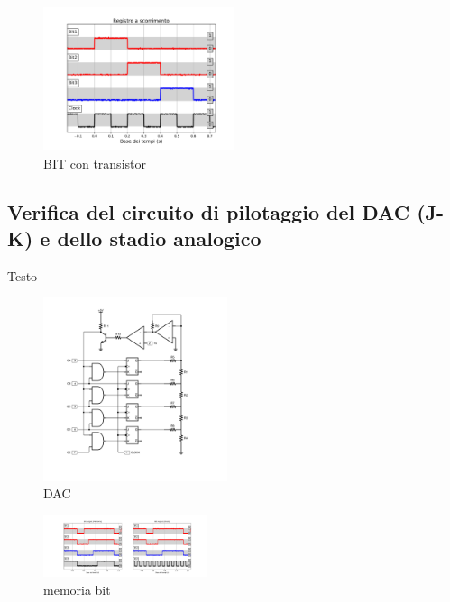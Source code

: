 \documentclass[journal]{IEEEtran}
\begin{document}
\begin{figure}[H]%
\begin{center}
\includegraphics[trim = {0 0 0 0}, clip, width=0.50\textwidth]{analysis/output/reg_test.pdf}
\caption{BIT con transistor}
\label{fig:BIT_with_transistor}
\end{center}
\end{figure}



\subsection{Verifica del circuito di pilotaggio del DAC (J-K) e dello stadio analogico}
Testo

\begin{figure}[H]%
\begin{center}
\includegraphics[width=0.48\textwidth]{sch-simulations/digital/output/DAC.pdf}
\caption{DAC}
\label{fig:circuit_DAC}
\end{center}
\end{figure}

\begin{figure}[H]%
\begin{center}
\includegraphics[trim = {100 0 550 0}, clip, width=0.43\textwidth]{analysis/output/cumulative_BIT.pdf}
\caption{memoria bit}
\label{fig:cumulative_BIT}
\end{center}
\end{figure}
\end{document}

